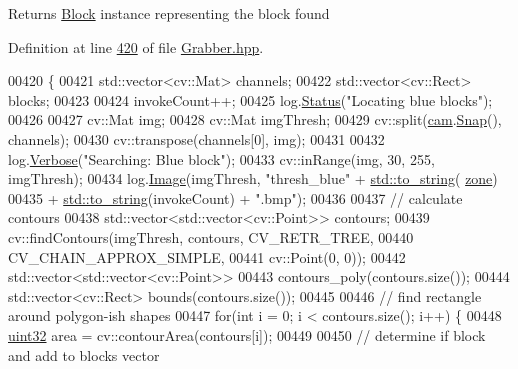 \begin{DoxyReturn}{Returns}
\hyperlink{classChipChipArray_1_1Block}{Block} instance representing the block found 
\end{DoxyReturn}


Definition at line \hyperlink{Grabber_8hpp_source_l00420}{420} of file \hyperlink{Grabber_8hpp_source}{Grabber.\+hpp}.


\begin{DoxyCode}
00420                                    \{
00421         std::vector<cv::Mat> channels;
00422         std::vector<cv::Rect> blocks;   
00423 
00424         invokeCount++;
00425         log.\hyperlink{classChipChipArray_1_1Log_a66575b6e94c6112e4cefa5736cb996e0}{Status}(\textcolor{stringliteral}{"Locating blue blocks"});
00426 
00427         cv::Mat img;
00428         cv::Mat imgThresh;
00429         cv::split(\hyperlink{classChipChipArray_1_1Grabber_a726bcc2367a719cb84de92a981947622}{cam}.\hyperlink{classChipChipArray_1_1PiCamera_a58fb0de02570dce9a9cb60a1a04fb84f}{Snap}(), channels);
00430         cv::transpose(channels[0], img);
00431 
00432         log.\hyperlink{classChipChipArray_1_1Log_a154a5f38d9c7a767693b242684a3d4d9}{Verbose}(\textcolor{stringliteral}{"Searching: Blue block"});
00433         cv::inRange(img, 30, 255, imgThresh);
00434         log.\hyperlink{classChipChipArray_1_1Log_a65bbab057c8b1453f9e4efcfee7522c4}{Image}(imgThresh, \textcolor{stringliteral}{"thresh\_blue"} + \hyperlink{namespacestd_aa5ddf582a1c96ffe258c997be9a294a3}{std::to\_string}(
      \hyperlink{classChipChipArray_1_1Grabber_ab57efe6e0b6f369b19528285a278d967}{zone})
00435                 + \hyperlink{namespacestd_aa5ddf582a1c96ffe258c997be9a294a3}{std::to\_string}(invokeCount) + \textcolor{stringliteral}{".bmp"});
00436 
00437         \textcolor{comment}{// calculate contours}
00438         std::vector<std::vector<cv::Point>> contours;
00439         cv::findContours(imgThresh, contours, CV\_RETR\_TREE,
00440                 CV\_CHAIN\_APPROX\_SIMPLE,
00441                 cv::Point(0, 0));
00442         std::vector<std::vector<cv::Point>>
00443             contours\_poly(contours.size());
00444         std::vector<cv::Rect> bounds(contours.size());
00445 
00446         \textcolor{comment}{// find rectangle around polygon-ish shapes}
00447         \textcolor{keywordflow}{for}(\textcolor{keywordtype}{int} i = 0; i < contours.size(); i++) \{
00448             \hyperlink{definitions_8hpp_a1134b580f8da4de94ca6b1de4d37975e}{uint32} area = cv::contourArea(contours[i]);
00449 
00450             \textcolor{comment}{// determine if block and add to blocks vector}

\end{DoxyCode}
